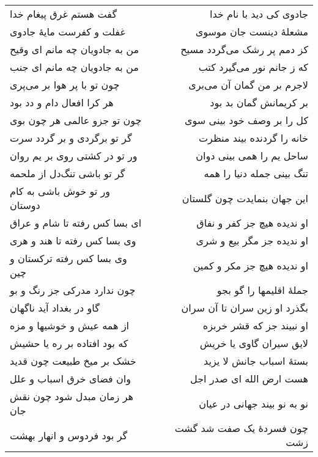 \begin{center}
\begin{longtable}{l p{0.5cm} r}
گفت هستم غرق پیغام خدا
&&
جادوی کی دید با نام خدا
\\
غفلت و کفرست مایهٔ جادوی
&&
مشعلهٔ دینست جان موسوی
\\
من به جادویان چه مانم ای وقیح
&&
کز دمم پر رشک می‌گردد مسیح
\\
من به جادویان چه مانم ای جنب
&&
که ز جانم نور می‌گیرد کتب
\\
چون تو با پر هوا بر می‌پری
&&
لاجرم بر من گمان آن می‌بری
\\
هر کرا افعال دام و دد بود
&&
بر کریمانش گمان بد بود
\\
چون تو جزو عالمی هر چون بوی
&&
کل را بر وصف خود بینی سوی
\\
گر تو برگردی و بر گردد سرت
&&
خانه را گردنده بیند منظرت
\\
ور تو در کشتی روی بر یم روان
&&
ساحل یم را همی بینی دوان
\\
گر تو باشی تنگ‌دل از ملحمه
&&
تنگ بینی جمله دنیا را همه
\\
ور تو خوش باشی به کام دوستان
&&
این جهان بنمایدت چون گلستان
\\
ای بسا کس رفته تا شام و عراق
&&
او ندیده هیچ جز کفر و نفاق
\\
وی بسا کس رفته تا هند و هری
&&
او ندیده جز مگر بیع و شری
\\
وی بسا کس رفته ترکستان و چین
&&
او ندیده هیچ جز مکر و کمین
\\
چون ندارد مدرکی جز رنگ و بو
&&
جملهٔ اقلیمها را گو بجو
\\
گاو در بغداد آید ناگهان
&&
بگذرد او زین سران تا آن سران
\\
از همه عیش و خوشیها و مزه
&&
او نبیند جز که قشر خربزه
\\
که بود افتاده بر ره یا حشیش
&&
لایق سیران گاوی یا خریش
\\
خشک بر میخ طبیعت چون قدید
&&
بستهٔ اسباب جانش لا یزید
\\
وان فضای خرق اسباب و علل
&&
هست ارض الله ای صدر اجل
\\
هر زمان مبدل شود چون نقش جان
&&
نو به نو بیند جهانی در عیان
\\
گر بود فردوس و انهار بهشت
&&
چون فسردهٔ یک صفت شد گشت زشت
\\
\end{longtable}
\end{center}
